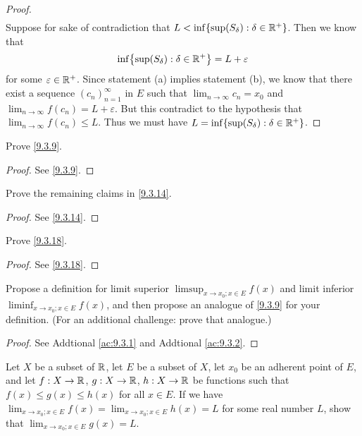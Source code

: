 \begin{proof}
\begin{align*}
  \end{align*}
  Suppose for sake of contradiction that \(L < \inf\set{\sup(S_\delta) : \delta \in \R^+}\).
  Then we know that
  \[
    \inf\set{\sup(S_\delta) : \delta \in \R^+} = L + \varepsilon
  \]
  for some \(\varepsilon \in \mathbb{R}^+\).
  Since statement (a) implies statement (b), we know that there exist a sequence \((c_n)_{n = 1}^\infty\) in \(E\) such that \(\lim_{n \to \infty} c_n = x_0\) and \(\lim_{n \to \infty} f(c_n) = L + \varepsilon\).
  But this contradict to the hypothesis that \(\lim_{n \to \infty} f(c_n) \leq L\).
  Thus we must have \(L = \inf\set{\sup(S_{\delta}) : \delta \in \R^+}\).
\end{proof}

\exercisesection

\begin{ex}\label{ex:9.3.1}
  Prove \cref{9.3.9}.
\end{ex}

\begin{proof}
  See \cref{9.3.9}.
\end{proof}

\begin{ex}\label{ex:9.3.2}
  Prove the remaining claims in \cref{9.3.14}.
\end{ex}

\begin{proof}
  See \cref{9.3.14}.
\end{proof}

\begin{ex}\label{ex:9.3.3}
  Prove \cref{9.3.18}.
\end{ex}

\begin{proof}
  See \cref{9.3.18}.
\end{proof}

\begin{ex}\label{ex:9.3.4}
  Propose a definition for limit superior \(\limsup_{x \to x_0 ; x \in E} f(x)\) and limit inferior \(\liminf_{x \to x_0 ; x \in E} f(x)\), and then propose an analogue of \cref{9.3.9} for your definition.
  (For an additional challenge: prove that analogue.)
\end{ex}

\begin{proof}
  See Addtional \cref{ac:9.3.1} and Addtional \cref{ac:9.3.2}.
\end{proof}

\begin{ex}\label{ex:9.3.5}
  Let \(X\) be a subset of \(\mathbb{R}\), let \(E\) be a subset of \(X\), let \(x_0\) be an adherent point of \(E\), and let \(f : X \to \mathbb{R}\), \(g : X \to \mathbb{R}\), \(h : X \to \mathbb{R}\) be functions such that \(f(x) \leq g(x) \leq h(x)\) for all \(x \in E\).
  If we have \(\lim_{x \to x_0 ; x \in E} f(x) = \lim_{x \to x_0 ; x \in E} h(x) = L\) for some real number \(L\), show that \(\lim_{x \to x_0 ; x \in E} g(x) = L\).
\end{ex}

